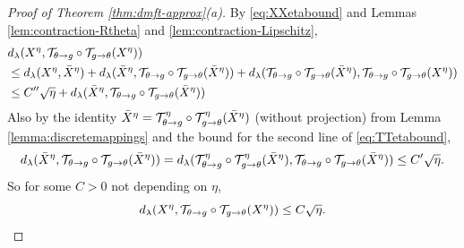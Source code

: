 \begin{proof}[Proof of Theorem \ref{thm:dmft-approx}(a)]
 
By \eqref{eq:XXetabound} and Lemmas \ref{lem:contraction-Rtheta} and \ref{lem:contraction-Lipschitz},
\begin{align*}
    &d_{\lambda}(X^\eta,\mathcal{T}_{\theta \to g} \circ \mathcal{T}_{g \to \theta}(X^\eta))\\
    &\leq d_{\lambda}(X^\eta,\bar X^\eta) +
d_{\lambda}(\bar X^\eta,\mathcal{T}_{\theta \to g} \circ \mathcal{T}_{g \to \theta}(\bar X^\eta)) +
d_{\lambda}(\mathcal{T}_{\theta \to g} \circ \mathcal{T}_{g \to \theta}(\bar X^\eta), \mathcal{T}_{\theta \to g} \circ \mathcal{T}_{g \to
\theta}(X^\eta)) \\ 
    &\le C''\sqrt{\eta}+
d_{\lambda}(\bar X^\eta,\mathcal{T}_{\theta \to g} \circ \mathcal{T}_{g \to \theta}(\bar X^\eta))
  \end{align*}
Also by the identity $\bar X^\eta=\mathcal{T}_{\theta \to g}^\eta \circ \mathcal{T}_{g \to
\theta}^\eta(\bar X^\eta)$ (without projection) from 
Lemma \ref{lemma:discretemappings} and the bound for the second line of
\eqref{eq:TTetabound},
\[d_{\lambda}(\bar X^\eta,\mathcal{T}_{\theta \to g} \circ \mathcal{T}_{g \to \theta}(\bar
X^\eta))=d_{\lambda}(\mathcal{T}_{\theta \to g}^\eta \circ \mathcal{T}_{g \to \theta}^\eta(\bar
X^\eta),\mathcal{T}_{\theta \to g} \circ \mathcal{T}_{g \to \theta}(\bar X^\eta))
\leq C'\sqrt{\eta}.\]
So for some $C>0$ not depending on $\eta$,
\begin{equation}\label{eq:Xfixedpoint}
d_{\lambda}(X^\eta,\mathcal{T}_{\theta \to g} \circ \mathcal{T}_{g \to \theta}(X^\eta))
\leq C\sqrt{\eta}.
\end{equation}


\end{proof}
